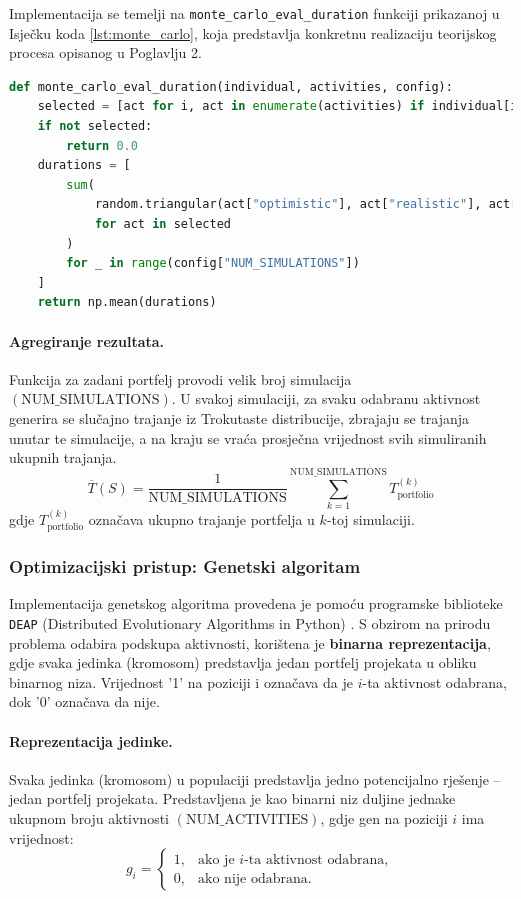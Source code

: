 Implementacija se temelji na \texttt{monte\_carlo\_eval\_duration} funkciji prikazanoj u Isječku koda \ref{lst:monte_carlo}, koja predstavlja konkretnu realizaciju teorijskog procesa opisanog u Poglavlju 2. 
\begin{lstlisting}[language=Python, caption={Funkcija za Monte Carlo procjenu trajanja}, label={lst:monte_carlo}, captionpos=b]
def monte_carlo_eval_duration(individual, activities, config):
    selected = [act for i, act in enumerate(activities) if individual[i] == 1]
    if not selected:
        return 0.0
    durations = [
        sum(
            random.triangular(act["optimistic"], act["realistic"], act["pessimistic"])
            for act in selected
        )
        for _ in range(config["NUM_SIMULATIONS"])
    ]
    return np.mean(durations)
\end{lstlisting}


\paragraph{Agregiranje rezultata.}
Funkcija za zadani portfelj provodi velik broj simulacija $(\text{NUM\_SIMULATIONS})$. U svakoj simulaciji, za svaku odabranu aktivnost generira se slučajno trajanje iz Trokutaste distribucije, zbrajaju se trajanja unutar te simulacije, a na kraju se vraća prosječna vrijednost svih simuliranih ukupnih trajanja.
\[
\overline{T}(S) = \frac{1}{\text{NUM\_SIMULATIONS}} \sum_{k=1}^{\text{NUM\_SIMULATIONS}} T_{\text{portfolio}}^{(k)}
\]
gdje $T_{\text{portfolio}}^{(k)}$ označava ukupno trajanje portfelja u $k$-toj simulaciji.


\subsubsection{Optimizacijski pristup: Genetski algoritam}

Implementacija genetskog algoritma provedena je pomoću programske biblioteke \texttt{DEAP} (Distributed Evolutionary Algorithms in Python) \cite{DEAP2012}. 
S obzirom na prirodu problema odabira podskupa aktivnosti, korištena je \textbf{binarna reprezentacija}, gdje svaka jedinka (kromosom) predstavlja jedan portfelj projekata u obliku binarnog niza. Vrijednost '1' na poziciji i označava da je $i$-ta aktivnost odabrana, dok '0' označava da nije.
\paragraph{Reprezentacija jedinke.}
Svaka jedinka (kromosom) u populaciji predstavlja jedno potencijalno rješenje – jedan portfelj projekata. 
Predstavljena je kao binarni niz duljine jednake ukupnom broju aktivnosti $(\text{NUM\_ACTIVITIES})$, gdje gen na poziciji $i$ ima vrijednost:
\[
g_i =
\begin{cases}
1, & \text{ako je $i$-ta aktivnost odabrana}, \\
0, & \text{ako nije odabrana}.
\end{cases}
\]
